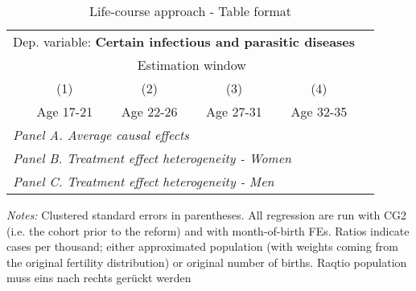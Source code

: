  \begin{table}[H] \centering \begin{threeparttable} \caption{Life-course approach - Table format} {\def\sym#1{\ifmmode^{#1}\else\(^{#1}\)\fi} \begin{tabular}{l*{5}{c}} \toprule \multicolumn{5}{l}{Dep. variable: \textbf{Certain infectious and parasitic diseases}} \\ & \multicolumn{4}{c}{Estimation window} \\ \cmidrule(lr){2-5}
            &\multicolumn{1}{c}{(1)}&\multicolumn{1}{c}{(2)}&\multicolumn{1}{c}{(3)}&\multicolumn{1}{c}{(4)}\\
            &\multicolumn{1}{c}{Age 17-21}&\multicolumn{1}{c}{Age 22-26}&\multicolumn{1}{c}{Age 27-31}&\multicolumn{1}{c}{Age 32-35}\\
\midrule
 \multicolumn{5}{l}{\emph{Panel A. Average causal effects}} \\      \midrule\multicolumn{5}{l}{\emph{Panel B. Treatment effect heterogeneity - Women}} \\      \midrule\multicolumn{5}{l}{\emph{Panel C. Treatment effect heterogeneity - Men}} \\      
\bottomrule \end{tabular} } \begin{tablenotes} \item \scriptsize \emph{Notes:} Clustered standard errors in parentheses. All regression are run with CG2 (i.e. the cohort prior to the reform) and with month-of-birth FEs. Ratios indicate cases per thousand; either approximated population (with weights coming from the original fertility distribution) or original number of births. Raqtio population muss eins nach rechts gerückt werden \end{tablenotes} \end{threeparttable} \end{table} 
